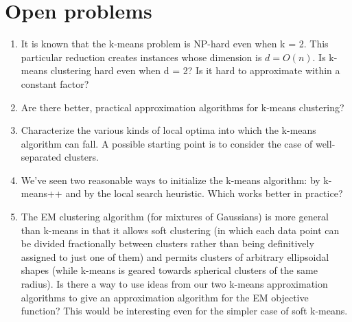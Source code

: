 \documentclass{article}
\begin{document}
\section{Open problems}

\begin{enumerate}
    \item It is known that the k-means problem is NP-hard even when k = 2. This particular reduction creates instances whose dimension is $d = O(n)$. Is k-means clustering hard even when d = 2? Is it hard to approximate within a constant factor?
    \item Are there better, practical approximation algorithms for k-means clustering?
    \item Characterize the various kinds of local optima into which the k-means algorithm can fall. A possible starting point is to consider the case of well-separated clusters.
    \item We've seen two reasonable ways to initialize the k-means algorithm: by k-means++ and by the local search heuristic. Which works better in practice?
    \item The EM clustering algorithm (for mixtures of Gaussians) is more general than k-means in that it allows soft clustering (in which each data point can be divided fractionally between clusters rather than being definitively assigned to just one of them) and permits clusters of arbitrary ellipsoidal shapes (while k-means is geared towards spherical clusters of the same radius). Is there a way to use ideas from our two k-means approximation algorithms to give an approximation algorithm for the EM objective function? This would be interesting even for the simpler case of soft k-means.
\end{enumerate}
\end{document}
